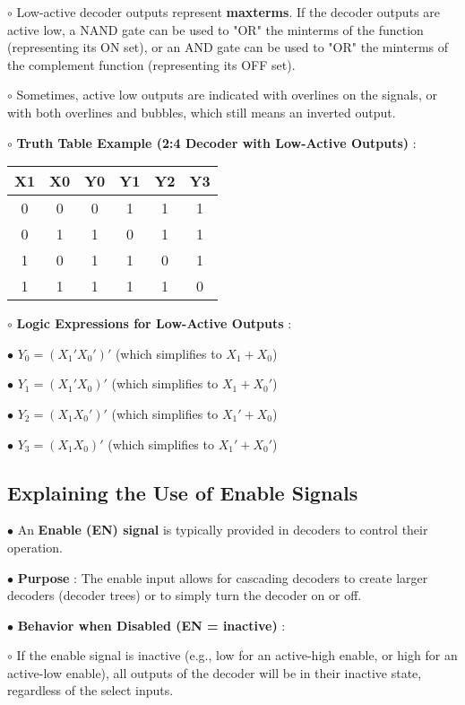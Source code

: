 \documentclass{article}
\begin{document}
    $\circ$ Low-active decoder outputs represent \textbf{maxterms}. If the decoder outputs are active low, a NAND gate can be used to "OR" the minterms of the function (representing its ON set), or an AND gate can be used to "OR" the minterms of the complement function (representing its OFF set).

    $\circ$ Sometimes, active low outputs are indicated with overlines on the signals, or with both overlines and bubbles, which still means an inverted output.

    $\circ$ \textbf{Truth Table Example (2:4 Decoder with Low-Active Outputs)} : 
    \begin{tabular}{c c | c c c c}
    \toprule
     X1 & X0 & Y0 & Y1 & Y2 & Y3 \\
    \midrule
     0 & 0 & 0 & 1 & 1 & 1 \\
     0 & 1 & 1 & 0 & 1 & 1 \\
     1 & 0 & 1 & 1 & 0 & 1 \\
     1 & 1 & 1 & 1 & 1 & 0 \\
    \bottomrule
    
\end{tabular}


    $\circ$ \textbf{Logic Expressions for Low-Active Outputs} :

        $\bullet$ $Y_0 = (X_1' X_0')'$ (which simplifies to $X_1 + X_0$)

        $\bullet$ $Y_1 = (X_1' X_0)'$ (which simplifies to $X_1 + X_0'$)

        $\bullet$ $Y_2 = (X_1 X_0')'$ (which simplifies to $X_1' + X_0$)

        $\bullet$ $Y_3 = (X_1 X_0)'$ (which simplifies to $X_1' + X_0'$)

\subsection{Explaining the Use of Enable Signals}

$\bullet$ An \textbf{Enable (EN) signal} is typically provided in decoders to control their operation.

$\bullet$ \textbf{Purpose} : The enable input allows for cascading decoders to create larger decoders (decoder trees) or to simply turn the decoder on or off.

$\bullet$ \textbf{Behavior when Disabled (EN = inactive)} :

    $\circ$ If the enable signal is inactive (e.g., low for an active-high enable, or high for an active-low enable), all outputs of the decoder will be in their inactive state, regardless of the select inputs.
\end{document}
